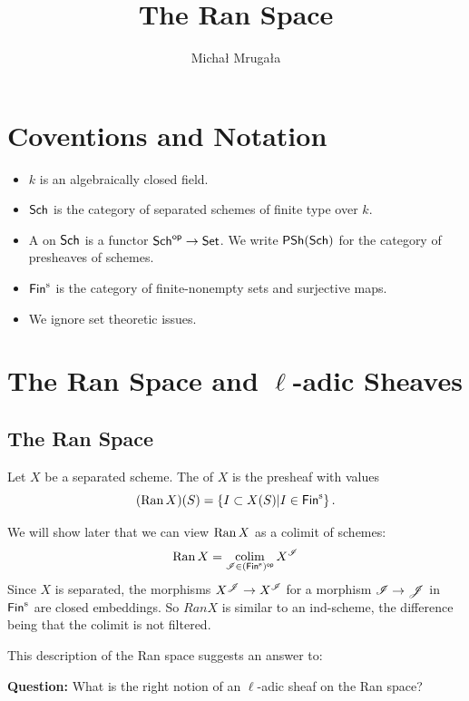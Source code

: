 \documentclass[oneside]{amsart}
\title{The Ran Space}
\author{Micha{\l} Mruga{\l}a}
\begin{document}
\maketitle

\setcounter{section}{0}
\section{Coventions and Notation}
\begin{itemize}
	\item $k$ is an algebraically closed field.
	\item $\mathsf{Sch}$ is the category of separated schemes of finite type over $k$.
	\item A  on $\mathsf{Sch}$ is a functor $\Sch\op\to \cat{Set}$. We write $\mathsf{PSh}(\mathsf{Sch})$ for the category of presheaves of schemes.
	\item $\Fins$ is the category of finite-nonempty sets and surjective maps.
	\item We ignore set theoretic issues.
\end{itemize}

\section{\texorpdfstring{The Ran Space and $\ell$-adic Sheaves}{The Ran Space and l-adic Sheaves}}
\subsection{The Ran Space}
\begin{definition}	
	Let $X$ be a separated scheme. The  of $X$ is the presheaf with values
	\[
		(\Ran X)(S) = \left\{ I\subset X(S) \middle| I \in \Fins \right\}.
	\] 
\end{definition}
We will show later that we can view $\operatorname{Ran} X$ as a colimit of schemes:
\[
\Ran X = \colim_{\CI\in (\Fins)\op} X^{\CI}
\] 
Since $X$ is separated, the morphisms $X^{\CJ}\to X^{\CI}$ for a morphism $\CI\to \CJ$ in $\Fins$ are closed embeddings. So $Ran X$ is similar to an ind-scheme, the difference being that the colimit is not filtered.

This description of the Ran space suggests an answer to:

\vspace{0.5em}
\begin{center}
	\textbf{Question:} What is the right notion of an $\ell$-adic sheaf on the Ran space?
\end{center}
\vspace{0.5em}
\end{document}
